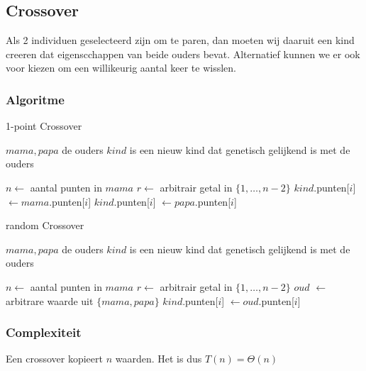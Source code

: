 %
\subsection{Crossover}
\label{sub:crossover}
Als 2 individuen geselecteerd zijn om te paren, dan moeten wij daaruit een kind creeren dat eigenscchappen van beide ouders bevat. 
Alternatief kunnen we er ook voor kiezen om een willikeurig aantal keer te wisslen.
\subsubsection{Algoritme}
	\begin{algorithm}[H]
	 	\caption{1-point Crossover}
		\begin{algorithmic}
		\Require $mama, papa$ de ouders
		\Ensure $kind$ is een nieuw kind dat genetisch gelijkend is met de ouders
		
		\State $n \gets $ aantal punten in $mama$
		\State $r \gets$ arbitrair getal in $\lbrace 1, \dots , n-2\rbrace$
			\State $kind$.punten[$i$] $\gets mama$.punten[$i$]
		\EndFor
			\State $kind$.punten[$i$] $\gets papa$.punten[$i$]
		\EndFor
		\end{algorithmic}
		\label{alg:crossover-1point}
	\end{algorithm}		

	\begin{algorithm}[H]
	 	\caption{random Crossover}
		\begin{algorithmic}
		\Require $mama, papa$ de ouders
		\Ensure $kind$ is een nieuw kind dat genetisch gelijkend is met de ouders
		
		\State $n \gets $ aantal punten in $mama$
		\State $r \gets$ arbitrair getal in $\lbrace 1, \dots , n-2\rbrace$
		\For{i \textbf{from} 0 \textbf{to} $n-1$}
		\State $oud$ $\gets$ arbitrare waarde uit $\lbrace mama, papa \rbrace$
		\State $kind$.punten[$i$] $\gets oud$.punten[$i$]
			
		\EndFor

		\end{algorithmic}
		\label{alg:crossover-random}
	\end{algorithm}		



\subsubsection{Complexiteit}
\label{sub:alg_crossover_compl}
Een crossover kopieert $n$ waarden. Het is dus $T(n)=\Theta(n)$


